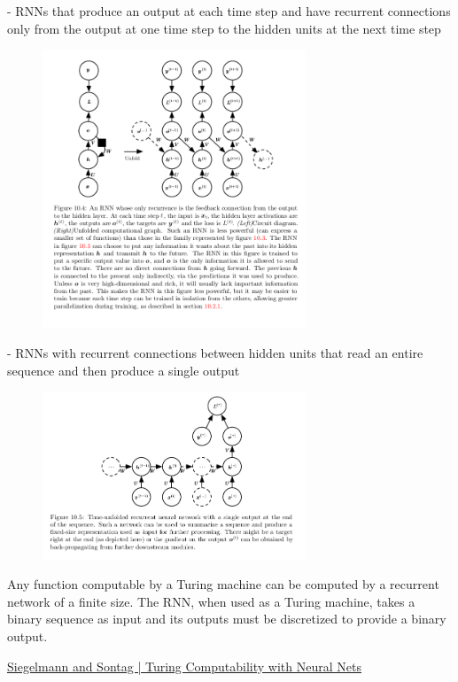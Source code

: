 \documentclass[letterpaper, 12pt]{report}
\begin{document}
- RNNs that produce an output at each time step and have recurrent connections only from the output at one time step to the hidden units at the next time step 

\begin{figure}[h]
  \centering
  \includegraphics[width=0.7\textwidth]{rnn_dp_2.png}
\end{figure}

- RNNs with recurrent connections between hidden units that read an entire sequence and then produce a single output 

\begin{figure}[h]
  \centering
  \includegraphics[width=0.7\textwidth]{rnn_dp_3.png}
\end{figure}

Any function computable by a Turing machine can be computed by a recurrent network of a finite size. The RNN, when used as a Turing machine, takes a binary sequence as input and its outputs must be discretized to provide a binary output. 

\href{https://www.sciencedirect.com/science/article/pii/089396599190080F}{Siegelmann and Sontag | Turing Computability with Neural Nets}
\end{document}
